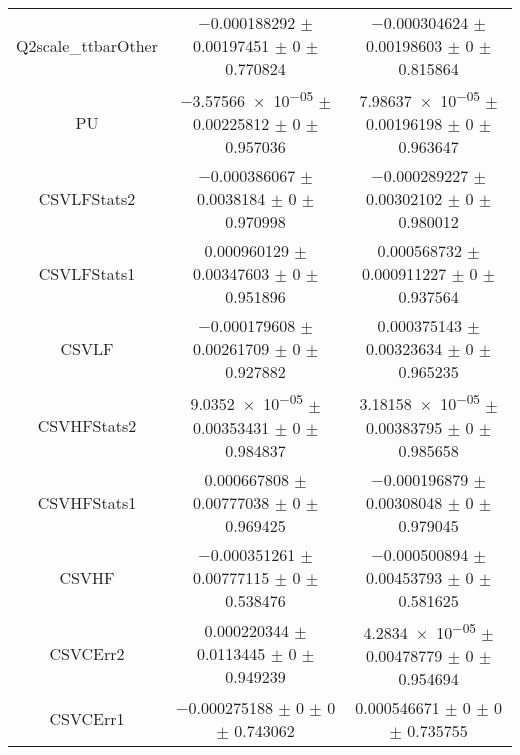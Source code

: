 \begin{table}
\begin{tabular}{ccc}
Q2scale\_ttbarOther & \num{-0.000188292} $\pm$ \num{0.00197451} $\pm$ \num{0} $\pm$ \num{0.770824} & \num{-0.000304624} $\pm$ \num{0.00198603} $\pm$ \num{0} $\pm$ \num{0.815864}\\
PU & \num{-3.57566e-05} $\pm$ \num{0.00225812} $\pm$ \num{0} $\pm$ \num{0.957036} & \num{7.98637e-05} $\pm$ \num{0.00196198} $\pm$ \num{0} $\pm$ \num{0.963647}\\
CSVLFStats2 & \num{-0.000386067} $\pm$ \num{0.0038184} $\pm$ \num{0} $\pm$ \num{0.970998} & \num{-0.000289227} $\pm$ \num{0.00302102} $\pm$ \num{0} $\pm$ \num{0.980012}\\
CSVLFStats1 & \num{0.000960129} $\pm$ \num{0.00347603} $\pm$ \num{0} $\pm$ \num{0.951896} & \num{0.000568732} $\pm$ \num{0.000911227} $\pm$ \num{0} $\pm$ \num{0.937564}\\
CSVLF & \num{-0.000179608} $\pm$ \num{0.00261709} $\pm$ \num{0} $\pm$ \num{0.927882} & \num{0.000375143} $\pm$ \num{0.00323634} $\pm$ \num{0} $\pm$ \num{0.965235}\\
CSVHFStats2 & \num{9.0352e-05} $\pm$ \num{0.00353431} $\pm$ \num{0} $\pm$ \num{0.984837} & \num{3.18158e-05} $\pm$ \num{0.00383795} $\pm$ \num{0} $\pm$ \num{0.985658}\\
CSVHFStats1 & \num{0.000667808} $\pm$ \num{0.00777038} $\pm$ \num{0} $\pm$ \num{0.969425} & \num{-0.000196879} $\pm$ \num{0.00308048} $\pm$ \num{0} $\pm$ \num{0.979045}\\
CSVHF & \num{-0.000351261} $\pm$ \num{0.00777115} $\pm$ \num{0} $\pm$ \num{0.538476} & \num{-0.000500894} $\pm$ \num{0.00453793} $\pm$ \num{0} $\pm$ \num{0.581625}\\
CSVCErr2 & \num{0.000220344} $\pm$ \num{0.0113445} $\pm$ \num{0} $\pm$ \num{0.949239} & \num{4.2834e-05} $\pm$ \num{0.00478779} $\pm$ \num{0} $\pm$ \num{0.954694}\\
CSVCErr1 & \num{-0.000275188} $\pm$ \num{0} $\pm$ \num{0} $\pm$ \num{0.743062} & \num{0.000546671} $\pm$ \num{0} $\pm$ \num{0} $\pm$ \num{0.735755}\\
\bottomrule
\end{tabular}
\end{table}
